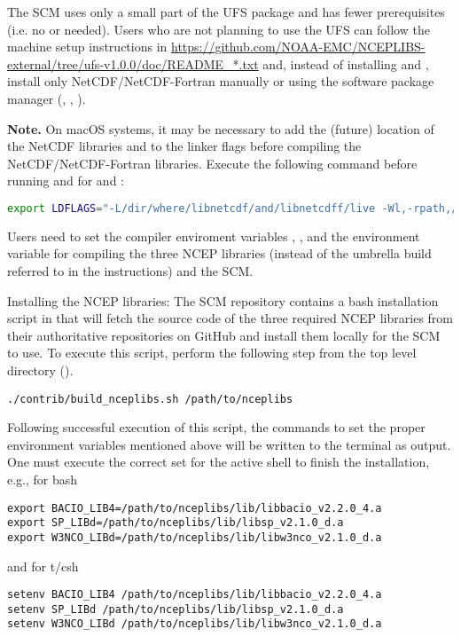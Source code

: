 The SCM uses only a small part of the UFS  package and has fewer prerequisites (i.e. no  or  needed). Users who are not planning to use the UFS can follow the machine setup instructions in \url{https://github.com/NOAA-EMC/NCEPLIBS-external/tree/ufs-v1.0.0/doc/README_*.txt} and, instead of installing  and , install only NetCDF/NetCDF-Fortran manually or using the software package manager (, , ).

\textbf{Note.} On macOS systems, it may be necessary to add the (future) location of the NetCDF libraries  and  to the  linker flags before compiling the NetCDF/NetCDF-Fortran libraries. Execute the following command before running  and  for  and :
\begin{lstlisting}[language=bash]
export LDFLAGS="-L/dir/where/libnetcdf/and/libnetcdff/live -Wl,-rpath,/dir/where/libnetcdf/and/libnetcdff/live"
\end{lstlisting}

Users need to set the compiler enviroment variables ,  ,  and the environment variable  for compiling the three NCEP libraries (instead of the  umbrella build referred to in the  instructions) and the SCM.

Installing the NCEP libraries: The SCM repository contains a bash installation script in  that will fetch the source code of the three required NCEP libraries from their authoritative repositories on GitHub and install them locally for the SCM to use. To execute this script, perform the following step from the top level directory (). 
\begin{lstlisting}
./contrib/build_nceplibs.sh /path/to/nceplibs
\end{lstlisting}

Following successful execution of this script, the commands to set the proper environment variables mentioned above will be written to the terminal as output. One must execute the correct set for the active shell to finish the installation, e.g., for bash
\begin{lstlisting}
export BACIO_LIB4=/path/to/nceplibs/lib/libbacio_v2.2.0_4.a
export SP_LIBd=/path/to/nceplibs/lib/libsp_v2.1.0_d.a
export W3NCO_LIBd=/path/to/nceplibs/lib/libw3nco_v2.1.0_d.a
\end{lstlisting}
and for t/csh
\begin{lstlisting}
setenv BACIO_LIB4 /path/to/nceplibs/lib/libbacio_v2.2.0_4.a
setenv SP_LIBd /path/to/nceplibs/lib/libsp_v2.1.0_d.a
setenv W3NCO_LIBd /path/to/nceplibs/lib/libw3nco_v2.1.0_d.a
\end{lstlisting}

